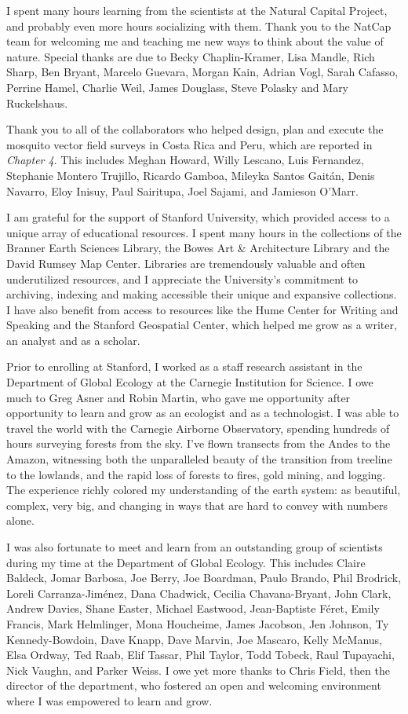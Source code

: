 I spent many hours learning from the scientists at the Natural Capital Project, and probably even more hours socializing with them. Thank you to the NatCap team for welcoming me and teaching me new ways to think about the value of nature. Special thanks are due to Becky Chaplin-Kramer, Lisa Mandle, Rich Sharp, Ben Bryant, Marcelo Guevara, Morgan Kain, Adrian Vogl, Sarah Cafasso, Perrine Hamel, Charlie Weil, James Douglass, Steve Polasky and Mary Ruckelshaus.

Thank you to all of the collaborators who helped design, plan and execute the mosquito vector field surveys in Costa Rica and Peru, which are reported in \textit{Chapter 4}. This includes Meghan Howard, Willy Lescano, Luis Fernandez, Stephanie Montero Trujillo, Ricardo Gamboa, Mileyka Santos Gaitán, Denis Navarro, Eloy Inisuy, Paul Sairitupa, Joel Sajami, and Jamieson O'Marr.

I am grateful for the support of Stanford University, which provided access to a unique array of educational resources. I spent many hours in the collections of the Branner Earth Sciences Library, the Bowes Art \& Architecture Library and the David Rumsey Map Center. Libraries are tremendously valuable and often underutilized resources, and I appreciate the University's commitment to archiving, indexing and making accessible their unique and expansive collections. I have also benefit from access to resources like the Hume Center for Writing and Speaking and the Stanford Geospatial Center, which helped me grow as a writer, an analyst and as a scholar.

Prior to enrolling at Stanford, I worked as a staff research assistant in the Department of Global Ecology at the Carnegie Institution for Science. I owe much to Greg Asner and Robin Martin, who gave me opportunity after opportunity to learn and grow as an ecologist and as a technologist. I was able to travel the world with the Carnegie Airborne Observatory, spending hundreds of hours surveying forests from the sky. I've flown transects from the Andes to the Amazon, witnessing both the unparalleled beauty of the transition from treeline to the lowlands, and the rapid loss of forests to fires, gold mining, and logging. The experience richly colored my understanding of the earth system: as beautiful, complex, very big, and changing in ways that are hard to convey with numbers alone.

I was also fortunate to meet and learn from an outstanding group of scientists during my time at the Department of Global Ecology. This includes Claire Baldeck, Jomar Barbosa, Joe Berry, Joe Boardman, Paulo Brando, Phil Brodrick, Loreli Carranza-Jiménez, Dana Chadwick, Cecilia Chavana-Bryant, John Clark, Andrew Davies, Shane Easter, Michael Eastwood, Jean-Baptiste Féret, Emily Francis, Mark Helmlinger, Mona Houcheime, James Jacobson, Jen Johnson, Ty Kennedy-Bowdoin, Dave Knapp, Dave Marvin, Joe Mascaro, Kelly McManus, Elsa Ordway, Ted Raab, Elif Tassar, Phil Taylor, Todd Tobeck, Raul Tupayachi, Nick Vaughn, and Parker Weiss. I owe yet more thanks to Chris Field, then the director of the department, who fostered an open and welcoming environment where I was empowered to learn and grow.


